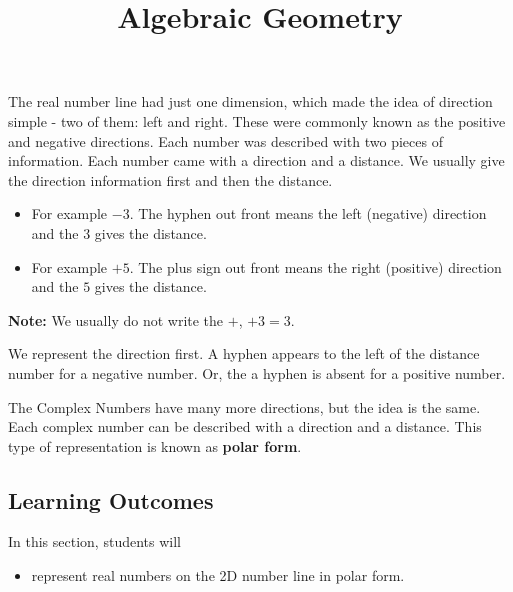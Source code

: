 \documentclass{ximera}
\title{Algebraic Geometry}
\begin{document}
\begin{abstract}
\end{abstract}
\maketitle





The real number line had just one dimension, which made the idea of direction simple - two of them: left and right.  These were commonly known as the positive and negative directions.  Each number was described with two pieces of information.  Each number came with a direction and a distance.  We usually give the direction information first and then the distance.


\begin{itemize}
\item For example $-3$.  The hyphen out front means the left (negative) direction and the $3$ gives the distance.
\item For example $+5$.  The plus sign out front means the right (positive) direction and the $5$ gives the distance.
\end{itemize}
\textbf{Note:} We usually do not write the $+$, $+3 = 3$.

We represent the direction first.  A hyphen appears to the left of the distance number for a negative number. Or, the a hyphen is absent for a positive number.

The Complex Numbers have many more directions, but the idea is the same.  Each complex number can be described with a direction and a distance.  This type of representation is known as \textbf{polar form}.






\subsection*{Learning Outcomes}



\begin{sectionOutcomes}
In this section, students will 

\begin{itemize}
\item represent real numbers on the 2D number line in polar form.
\end{itemize}
\end{sectionOutcomes}
\end{document}
